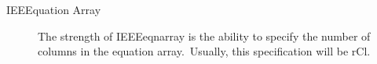 \documentclass[12pt]{article}
\begin{document}
    \begin{description}
        \item [IEEEquation Array]
        \hfill The strength of IEEEeqnarray is the ability to specify the number of
                columns in the equation array.\ Usually, this specification will be {rCl}.
    \end{description}
\end{document}
